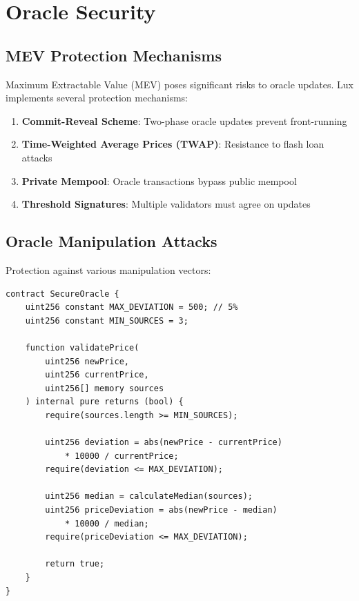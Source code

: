\section{Oracle Security}


\subsection{MEV Protection Mechanisms}

Maximum Extractable Value (MEV) poses significant risks to oracle updates. Lux implements several protection mechanisms:

\begin{enumerate}
    \item \textbf{Commit-Reveal Scheme}: Two-phase oracle updates prevent front-running
    \item \textbf{Time-Weighted Average Prices (TWAP)}: Resistance to flash loan attacks
    \item \textbf{Private Mempool}: Oracle transactions bypass public mempool
    \item \textbf{Threshold Signatures}: Multiple validators must agree on updates
\end{enumerate}

\subsection{Oracle Manipulation Attacks}

Protection against various manipulation vectors:

\begin{lstlisting}[caption={Oracle Manipulation Protection}]
contract SecureOracle {
    uint256 constant MAX_DEVIATION = 500; // 5%
    uint256 constant MIN_SOURCES = 3;
    
    function validatePrice(
        uint256 newPrice,
        uint256 currentPrice,
        uint256[] memory sources
    ) internal pure returns (bool) {
        require(sources.length >= MIN_SOURCES);
        
        uint256 deviation = abs(newPrice - currentPrice) 
            * 10000 / currentPrice;
        require(deviation <= MAX_DEVIATION);
        
        uint256 median = calculateMedian(sources);
        uint256 priceDeviation = abs(newPrice - median) 
            * 10000 / median;
        require(priceDeviation <= MAX_DEVIATION);
        
        return true;
    }
}
\end{lstlisting}

